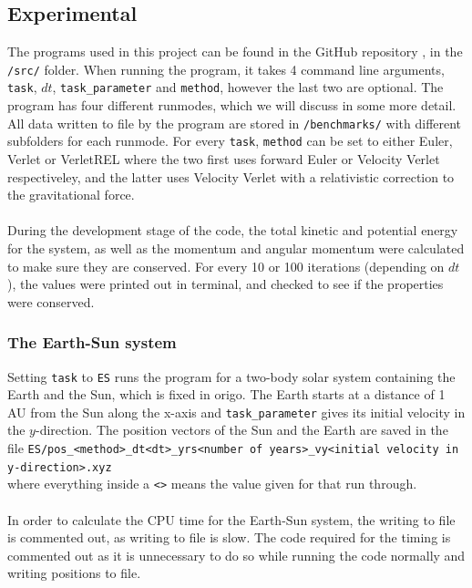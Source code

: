 \documentclass{article}
\begin{document}
\subsection{Experimental}
The programs used in this project can be found in the GitHub repository \cite{Github}, in the \texttt{/src/} folder. When running the program, it takes 4 command line arguments, \texttt{task}, $dt$, \texttt{task\_parameter} and \texttt{method}, however the last two are optional. The program has four different runmodes, which we will discuss in some more detail. All data written to file by the program are stored in \texttt{/benchmarks/} with different subfolders for each runmode. For every \texttt{task}, \texttt{method} can be set to either Euler, Verlet or VerletREL where the two first uses forward Euler or Velocity Verlet respectiveley, and the latter uses Velocity Verlet with a relativistic correction to the gravitational force. \\\\
During the development stage of the code, the total kinetic and potential energy for the system, as well as the momentum and angular momentum were calculated to make sure they are conserved. For every 10 or 100 iterations (depending on $dt$), the values were printed out in terminal, and checked to see if the properties were conserved.%
\subsubsection{The Earth-Sun system}
Setting \texttt{task} to \texttt{ES} runs the program for a two-body solar system containing the Earth and the Sun, which is fixed in origo. The Earth starts at a distance of 1 AU from the Sun along  the x-axis and \texttt{task\_parameter} gives its initial velocity in the $y$-direction. The position vectors of the Sun and the Earth are saved in the file \texttt{ES/pos\_<method>\_dt<dt>\_yrs<number of years>\_vy<initial velocity in y-direction>.xyz}\\ where everything inside a \texttt{<>} means the value given for that run through.\\\\
In order to calculate the CPU time for the Earth-Sun system, the writing to file is commented out, as writing to file is slow. The code required for the timing is commented out as it is unnecessary to do so while running the code normally and writing positions to file.
\end{document}
